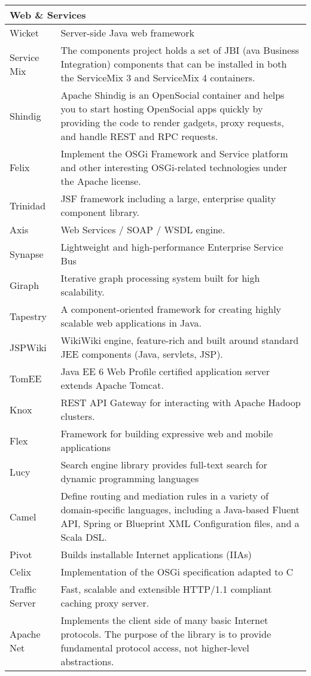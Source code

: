 {\begin{longtable}{|p{2cm} | p{14cm}|}
\hline
\multicolumn{2}{|l|}{Web \& Services} \\
\hline

Wicket & Server-side Java web framework
\\ Service Mix & The components project holds a set of JBI (ava Business Integration) components that can be installed in both the ServiceMix 3 and ServiceMix 4 containers.
\\ Shindig & Apache Shindig is an OpenSocial container and helps you to start hosting OpenSocial apps quickly by providing the code to render gadgets, proxy requests, and handle REST and RPC requests.
\\ Felix & Implement the OSGi Framework and Service platform and other interesting OSGi-related technologies under the Apache license.
\\ Trinidad &  JSF framework including a large, enterprise quality component library.
\\ Axis & Web Services / SOAP / WSDL engine.
\\ Synapse & Lightweight and high-performance Enterprise Service Bus
\\ Giraph & Iterative graph processing system built for high scalability.
\\ Tapestry & A component-oriented framework for creating highly scalable web applications in Java.
\\ JSPWiki & WikiWiki engine, feature-rich and built around standard JEE components (Java, servlets, JSP).
\\ TomEE & Java EE 6 Web Profile certified application server extends Apache Tomcat.
\\ Knox & REST API Gateway for interacting with Apache Hadoop clusters.
\\ Flex & Framework for building expressive web and mobile applications
\\ Lucy & Search engine library provides full-text search for dynamic programming languages
\\ Camel & Define routing and mediation rules in a variety of domain-specific languages, including a Java-based Fluent API, Spring or Blueprint XML Configuration files, and a Scala DSL.
\\ Pivot & Builds installable Internet applications (IIAs)
\\ Celix & Implementation of the OSGi specification adapted to C
\\ Traffic Server & Fast, scalable and extensible HTTP/1.1 compliant caching proxy server.
\\ Apache Net & Implements the client side of many basic Internet protocols. The purpose of the library is to provide fundamental protocol access, not higher-level abstractions.

\end{longtable}}
